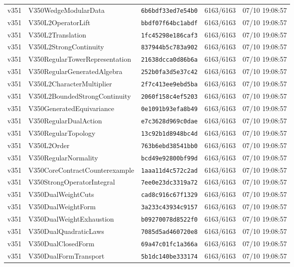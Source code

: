 \documentclass[11pt]{article}
\theoremstyle{definition}\newtheorem{deriv}{Derivação}
\begin{document}
{\begin{longtable}{@{}lllll@{}}
v351 & V350WedgeModularData & \texttt{6b6bdf33ed7e54b0} & 6163/6163 & 07/10 19:08:57 \\
v351 & V350L2OperatorLift & \texttt{bbdf07f64bc1abdf} & 6163/6163 & 07/10 19:08:57 \\
v351 & V350L2Translation & \texttt{1fc45298e186caf3} & 6163/6163 & 07/10 19:08:57 \\
v351 & V350L2StrongContinuity & \texttt{837944b5c783a902} & 6163/6163 & 07/10 19:08:57 \\
v351 & V350RegularTowerRepresentation & \texttt{21638dcca0d86b6a} & 6163/6163 & 07/10 19:08:57 \\
v351 & V350RegularGeneratedAlgebra & \texttt{252b0fa3d5e37c42} & 6163/6163 & 07/10 19:08:57 \\
v351 & V350L2CharacterMultiplier & \texttt{2f7c413ee9ebd5ba} & 6163/6163 & 07/10 19:08:57 \\
v351 & V350L2BoundedStrongContinuity & \texttt{2060f158c4ef5203} & 6163/6163 & 07/10 19:08:57 \\
v351 & V350GeneratedEquivariance & \texttt{0e1091b93efa8b49} & 6163/6163 & 07/10 19:08:57 \\
v351 & V350RegularDualAction & \texttt{e7c3628d969c0dae} & 6163/6163 & 07/10 19:08:57 \\
v351 & V350RegularTopology & \texttt{13c92b1d8948bc4d} & 6163/6163 & 07/10 19:08:57 \\
v351 & V350L2Order & \texttt{763b6ebd38541bb0} & 6163/6163 & 07/10 19:08:57 \\
v351 & V350RegularNormality & \texttt{bcd49e92800bf99d} & 6163/6163 & 07/10 19:08:57 \\
v351 & V350CoreContractCounterexample & \texttt{1aaa11d4c572c2ad} & 6163/6163 & 07/10 19:08:57 \\
v351 & V350StrongOperatorIntegral & \texttt{7ee0e23dc3319a72} & 6163/6163 & 07/10 19:08:57 \\
v351 & V350DualWeightCuts & \texttt{cad8c916c67f1329} & 6163/6163 & 07/10 19:08:57 \\
v351 & V350DualWeightForm & \texttt{3a233c43934c9157} & 6163/6163 & 07/10 19:08:57 \\
v351 & V350DualWeightExhaustion & \texttt{b09270078d8522f0} & 6163/6163 & 07/10 19:08:57 \\
v351 & V350DualQuadraticLaws & \texttt{7085d5ad460720e8} & 6163/6163 & 07/10 19:08:57 \\
v351 & V350DualClosedForm & \texttt{69a47c01fc1a366a} & 6163/6163 & 07/10 19:08:57 \\
v351 & V350DualFormTransport & \texttt{5b1dc140be333174} & 6163/6163 & 07/10 19:08:57 \\

\end{longtable}}
\end{document}

